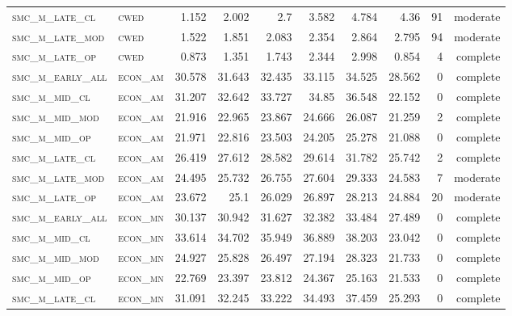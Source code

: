 \begin{landscape}
\begin{center}
\begin{footnotesize}
\begin{longtable}{llrrrrr|rrr}
\textsc{smc\_m\_late\_cl  } & \textsc{cwed      }   & 1.152    & 2.002    & 2.7      & 3.582    & 4.784    & 4.36     & 91  & moderate \\
\textsc{smc\_m\_late\_mod } & \textsc{cwed      }   & 1.522    & 1.851    & 2.083    & 2.354    & 2.864    & 2.795    & 94  & moderate \\
\textsc{smc\_m\_late\_op  } & \textsc{cwed      }   & 0.873    & 1.351    & 1.743    & 2.344    & 2.998    & 0.854    & 4   & complete \\
\textsc{smc\_m\_early\_all} & \textsc{econ\_am  }   & 30.578   & 31.643   & 32.435   & 33.115   & 34.525   & 28.562   & 0   & complete \\
\textsc{smc\_m\_mid\_cl   } & \textsc{econ\_am  }   & 31.207   & 32.642   & 33.727   & 34.85    & 36.548   & 22.152   & 0   & complete \\
\textsc{smc\_m\_mid\_mod  } & \textsc{econ\_am  }   & 21.916   & 22.965   & 23.867   & 24.666   & 26.087   & 21.259   & 2   & complete \\
\textsc{smc\_m\_mid\_op   } & \textsc{econ\_am  }   & 21.971   & 22.816   & 23.503   & 24.205   & 25.278   & 21.088   & 0   & complete \\
\textsc{smc\_m\_late\_cl  } & \textsc{econ\_am  }   & 26.419   & 27.612   & 28.582   & 29.614   & 31.782   & 25.742   & 2   & complete \\
\textsc{smc\_m\_late\_mod } & \textsc{econ\_am  }   & 24.495   & 25.732   & 26.755   & 27.604   & 29.333   & 24.583   & 7   & moderate \\
\textsc{smc\_m\_late\_op  } & \textsc{econ\_am  }   & 23.672   & 25.1     & 26.029   & 26.897   & 28.213   & 24.884   & 20  & moderate \\
\textsc{smc\_m\_early\_all} & \textsc{econ\_mn  }   & 30.137   & 30.942   & 31.627   & 32.382   & 33.484   & 27.489   & 0   & complete \\
\textsc{smc\_m\_mid\_cl   } & \textsc{econ\_mn  }   & 33.614   & 34.702   & 35.949   & 36.889   & 38.203   & 23.042   & 0   & complete \\
\textsc{smc\_m\_mid\_mod  } & \textsc{econ\_mn  }   & 24.927   & 25.828   & 26.497   & 27.194   & 28.323   & 21.733   & 0   & complete \\
\textsc{smc\_m\_mid\_op   } & \textsc{econ\_mn  }   & 22.769   & 23.397   & 23.812   & 24.367   & 25.163   & 21.533   & 0   & complete \\
\textsc{smc\_m\_late\_cl  } & \textsc{econ\_mn  }   & 31.091   & 32.245   & 33.222   & 34.493   & 37.459   & 25.293   & 0   & complete \\

\end{longtable}
\end{footnotesize}
\end{center}
\end{landscape}
